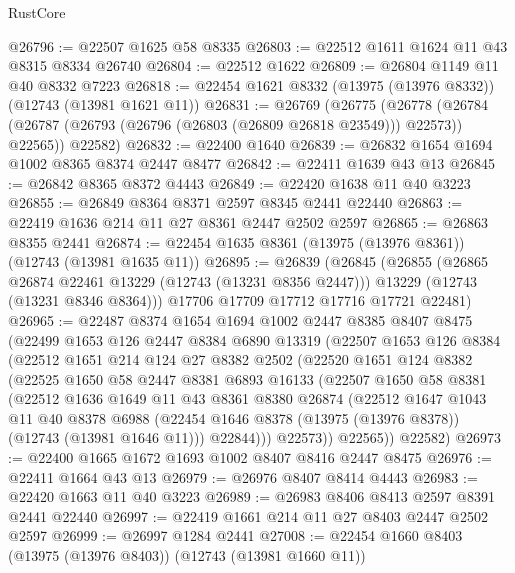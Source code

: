 \begin{lexlean}{RustCore}
\begin{coremodule}
@26796 := @22507 @1625 @58 @8335
@26803 := @22512 @1611 @1624 @11 @43 @8315 @8334 @26740
@26804 := @22512 @1622
@26809 := @26804 @1149 @11 @40 @8332 @7223
@26818 := @22454 @1621 @8332 (@13975 (@13976 @8332)) (@12743 (@13981 @1621 @11))
@26831 := @26769
    (@26775
      (@26778 (@26784 (@26787 (@26793 (@26796 (@26803 (@26809 @26818 @23549))) @22573)) @22565))
      @22582)
@26832 := @22400 @1640
@26839 := @26832 @1654 @1694 @1002 @8365 @8374 @2447 @8477
@26842 := @22411 @1639 @43 @13
@26845 := @26842 @8365 @8372 @4443
@26849 := @22420 @1638 @11 @40 @3223
@26855 := @26849 @8364 @8371 @2597 @8345 @2441 @22440
@26863 := @22419 @1636 @214 @11 @27 @8361 @2447 @2502 @2597
@26865 := @26863 @8355 @2441
@26874 := @22454 @1635 @8361 (@13975 (@13976 @8361)) (@12743 (@13981 @1635 @11))
@26895 := @26839
    (@26845
      (@26855
        (@26865 @26874 @22461 @13229 (@12743 (@13231 @8356 @2447)))
        @13229
        (@12743 (@13231 @8346 @8364)))
      @17706
      @17709
      @17712
      @17716
      @17721
      @22481)
@26965 := @22487
    @8374
    @1654
    @1694
    @1002
    @2447
    @8385
    @8407
    @8475
    (@22499
      @1653
      @126
      @2447
      @8384
      @6890
      @13319
      (@22507
        @1653
        @126
        @8384
        (@22512
          @1651
          @214
          @124
          @27
          @8382
          @2502
          (@22520
            @1651
            @124
            @8382
            (@22525
              @1650
              @58
              @2447
              @8381
              @6893
              @16133
              (@22507
                @1650
                @58
                @8381
                (@22512
                  @1636
                  @1649
                  @11
                  @43
                  @8361
                  @8380
                  @26874
                  (@22512
                    @1647
                    @1043
                    @11
                    @40
                    @8378
                    @6988
                    (@22454 @1646 @8378 (@13975 (@13976 @8378)) (@12743 (@13981 @1646 @11)))
                    @22844)))
              @22573))
          @22565))
      @22582)
@26973 := @22400 @1665 @1672 @1693 @1002 @8407 @8416 @2447 @8475
@26976 := @22411 @1664 @43 @13
@26979 := @26976 @8407 @8414 @4443
@26983 := @22420 @1663 @11 @40 @3223
@26989 := @26983 @8406 @8413 @2597 @8391 @2441 @22440
@26997 := @22419 @1661 @214 @11 @27 @8403 @2447 @2502 @2597
@26999 := @26997 @1284 @2441
@27008 := @22454 @1660 @8403 (@13975 (@13976 @8403)) (@12743 (@13981 @1660 @11))

\end{coremodule}
\end{lexlean}
